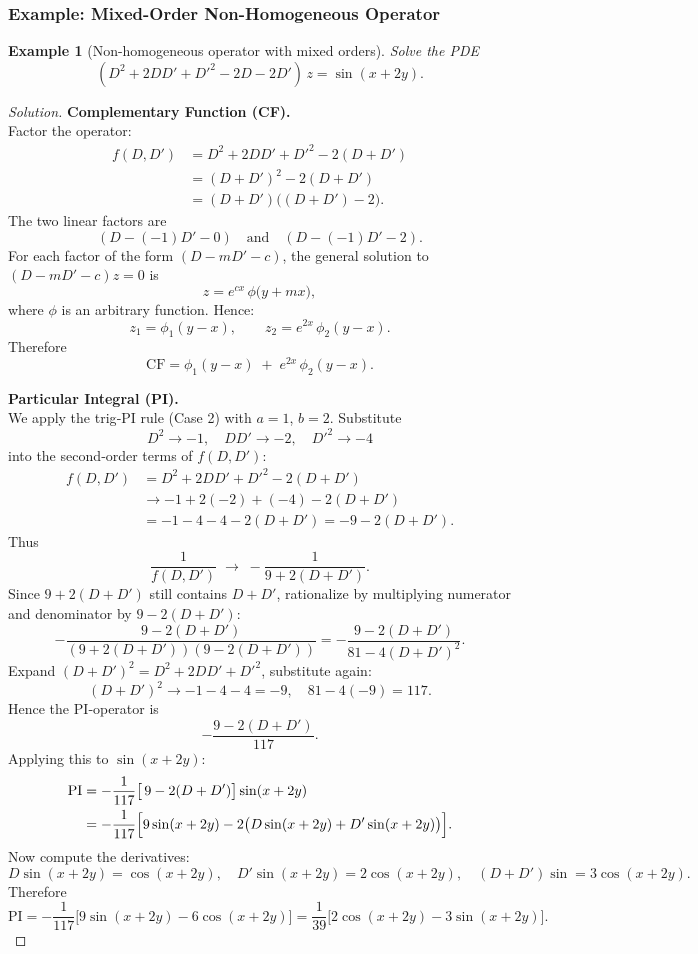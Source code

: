 \documentclass{article}
\newtheorem{example}{Example}[section]    %
\theoremstyle{remark}
\begin{document}
	\subsubsection{Example: Mixed-Order Non-Homogeneous Operator}
	\begin{example}[Non-homogeneous operator with mixed orders]
		\label{ex:nonhomoTrig}
		Solve the PDE
		\[
		(D^2 + 2DD' + D'^2 - 2D - 2D')\,z = \sin(x+2y).
		\]
	\end{example}
	\begin{proof}[Solution]
		\textbf{Complementary Function (CF).}\\
		Factor the operator:
		\begin{align*}
			f(D,D') &= D^2 + 2DD' + D'^2 - 2(D+D') \\
			&= (D + D')^2 - 2(D + D') \\
			&= (D + D')\bigl((D + D') - 2\bigr).
		\end{align*}
		The two linear factors are
		\[
		(D - (-1)D' - 0)
		\quad\text{and}\quad
		(D - (-1)D' - 2).
		\]
		For each factor of the form $(D - mD' - c)$, the general solution to
		$(D - mD' - c)z=0$ is
		\[
		z = e^{c x}\,\phi\bigl(y + m x\bigr),
		\]
		where $\phi$ is an arbitrary function.  Hence:
		\[
		z_1 = \phi_1(y - x),
		\qquad
		z_2 = e^{2x}\,\phi_2(y - x).
		\]
		Therefore
		\[
		\mathrm{CF} = \phi_1(y - x) \;+\; e^{2x}\,\phi_2(y - x).
		\]
		
		\medskip
		\textbf{Particular Integral (PI).}\\
		We apply the trig‐PI rule (Case 2) with $a=1$, $b=2$.  Substitute
		\[
		D^2\to -1,\quad
		DD'\to -2,\quad
		D'^2\to -4
		\]
		into the second‐order terms of $f(D,D')$:
		\begin{align*}
			f(D,D') &= D^2 + 2DD' + D'^2 - 2(D+D') \\
			&\longrightarrow -1 + 2(-2) + (-4) - 2(D+D') \\
			&= -1 -4 -4 -2(D+D') = -9 -2(D+D').
		\end{align*}
		Thus
		\[
		\frac1{f(D,D')} \;\longrightarrow\;
		-\frac1{9 + 2(D+D')}.
		\]
		Since $9+2(D+D')$ still contains $D+D'$, rationalize by multiplying
		numerator and denominator by $9-2(D+D')$:
		\[
		-\frac{9 - 2(D+D')}{(9 + 2(D+D'))(9 - 2(D+D'))}
		=
		-\frac{9 - 2(D+D')}{81 - 4(D+D')^2}.
		\]
		Expand $(D+D')^2 = D^2 + 2DD' + D'^2$, substitute again:
		\[
		(D + D')^2\longrightarrow -1 -4 -4 = -9,
		\quad
		81 - 4(-9) = 117.
		\]
		Hence the PI‐operator is
		\[
		-\frac{9 - 2(D+D')}{117}.
		\]
		Applying this to $\sin(x+2y)$:
		\begin{align*}
			\mathrm{PI}
			&= -\frac1{117}\bigl[\,9 - 2(D+D')\bigr]\sin(x+2y) \\
			&= -\frac1{117}\Bigl[9\sin(x+2y)
			- 2\bigl(D\sin(x+2y) + D'\sin(x+2y)\bigr)\Bigr].
		\end{align*}
		Now compute the derivatives:
		\[
		D\sin(x+2y) = \cos(x+2y),
		\quad
		D'\sin(x+2y) = 2\cos(x+2y),
		\quad
		(D+D')\sin = 3\cos(x+2y).
		\]
		Therefore
		\[
		\mathrm{PI}
		= -\frac1{117}\bigl[9\sin(x+2y) - 6\cos(x+2y)\bigr]
		= \frac1{39}\bigl[2\cos(x+2y) - 3\sin(x+2y)\bigr].
		\]
		

\end{proof}
\end{document}

